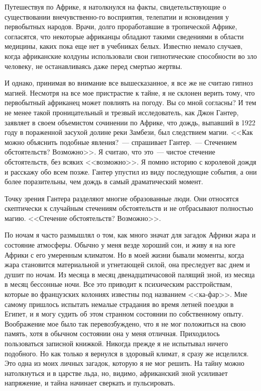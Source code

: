\documentclass[12pt,a4paper,twoside,openany,svgnames]{memoir}
\begin{document}
Путешествуя по Африке, я натолкнулся на факты, свидетельствующие о существовании внечувственно-го восприятия, телепатии и ясновидения у первобытных народов. Врачи, долго проработавшие в тропической Африке, согласятся, что некоторые африканцы обладают такими сведениями в области медицины, каких пока еще нет в учебниках белых. Известно немало случаев, когда африканские колдуны использовали свои гипнотические способности во зло человеку, не останавливаясь даже перед смертью жертвы.

И однако, принимая во внимание все вышесказанное, я все же не считаю гипноз магией. Несмотря на все мое пристрастие к тайне, я не склонен верить тому, что первобытный африканец может повлиять на погоду. Вы со мной согласны? И тем не менее такой проницательный и трезвый исследователь, как Джон Гантер, заявляет в своем объемистом сочинении по Африке, что дождь, выпавший в 1922 году в пораженной засухой долине реки Замбези, был следствием магии. <<Как можно объяснить подобные явления?~--- спрашивает Гантер.~--- Стечением обстоятельств? Возможно>>. Я считаю, что это~--- чистое стечение обстоятельств, без всяких <<возможно>>. Я помню историю с королевой дождя и расскажу обо всем позже. Гантер упустил из виду последующие события, а они более поразительны, чем дождь в самый драматический момент.

Точку зрения Гантера разделяют многие образованные люди. Они относятся скептически к случайным стечениям обстоятельств и не отбрасывают полностью магию. <<Стечение обстоятельств? Возможно>>.

По ночам я часто размышлял о том, как много значат для загадок Африки жара и состояние атмосферы. Обычно у меня везде хороший сон, и живу я на юге Африки с его умеренным климатом. Но в моей жизни бывали моменты, когда жара становится материальной и угнетающей силой, она преследует вас днем и душит по ночам. Из месяца в месяц двенадцатичасовой палящий зной, из месяца в месяц бессонные ночи. Все это приводит к психическим расстройствам, которые во французских колониях известны под названием <<ка-фар>>. Мне самому пришлось испытать немалые страдания во время летней поездки в Египет, и я могу судить об этом странном состоянии по собственному опыту. Воображение мое было так перевозбуждено, что я не мог положиться на свою память, хотя в обычном состоянии она у меня отличная. Приходилось пользоваться записной книжкой. Никогда прежде я не испытывал ничего подобного. Но как только я вернулся в здоровый климат, я сразу же исцелился. Это одна из моих личных загадок, которую я не мог решить. На тайну можно натолкнуться и в царстве льда, но, видимо, африканский зной усиливает напряжение, и тайна начинает сверкать и пульсировать.
\end{document}
